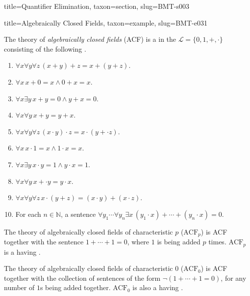 \documentclass[a4paper]{article}
\begin{document}
\begin{tree}{title={Quantifier Elimination}, taxon={section}, slug={BMT-s003}}
  
\begin{tree}{title={Algebraically Closed Fields}, taxon={example}, slug={BMT-e031}}

    The theory of \emph{algebraically closed fields} (ACF) is a  in the  \(\mathcal  L= \{ 0,1,+, \cdot \}\)
    consisting of the following .
    \begin{enumerate}
\item{\(\forall  x \forall  y \forall  z \, (x+y)+z=x+(y+z)\).
        }
        \item{\(\forall  x \, x+0=x \land0 +x=x\).
        }
        \item{\(\forall  x \exists  y \, x+y=0 \land  y+x=0\).
        }
        \item{\(\forall  x \forall  y \, x+y=y+x\).
        }
        \item{\(\forall  x \forall  y \forall  z \, (x \cdot  y) \cdot  z=x \cdot  (y+ \cdot  z)\).
        }
        \item{\(\forall  x \, x \cdot1 =x \land1 \cdot  x=x\).
        }
        \item{\(\forall  x \exists  y \, x \cdot  y=1 \land  y \cdot  x=1\).
        }
        \item{\(\forall  x \forall  y \, x+ \cdot  y=y \cdot  x\).
        }
        \item{\(\forall  x \forall  y \forall  z \, x \cdot (y+z)=(x \cdot  y)+(x \cdot  z)\).
        }
        \item{
            For each \(n \in \mathbb  N\), a sentence \(\forall  y_1 \cdots \forall  y_n \exists  x \, (y_1 \cdot  x)+ \cdots +(y_n \cdot  x)=0\).
        }
\end{enumerate}\par{
    The theory of algebraically closed fields of characteristic \(p\) (\(\text {ACF}_p\)) is ACF together with the sentence
    \(1+ \cdots +1=0\), where \(1\) is being added \(p\) times. \(\text {ACF}_p\) is a  having
    .
}\par{
    The theory of algebraically closed fields of characteristic \(0\) (\(\text {ACF}_0\)) is ACF together with the collection of sentences
    of the form \(\neg (1+ \cdots +1=0)\), for any number of \(1\)s being added together. \(\text {ACF}_0\) is also a
     having .
}
\end{tree}



\end{tree}
\end{document}

